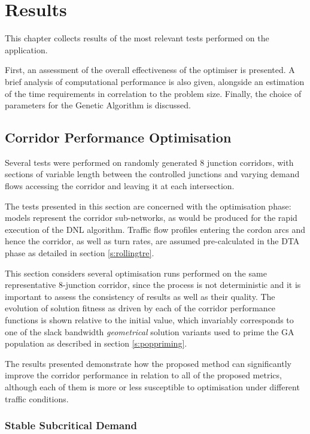 
\chapter{Results} \label{c:results}

This chapter collects results of the most relevant tests performed on the application. 

First, an assessment of the overall effectiveness of the optimiser is presented. A brief analysis of computational performance is also given, alongside an estimation of the time requirements in correlation to the problem size. Finally, the choice of parameters for the Genetic Algorithm is discussed.

\section{Corridor Performance Optimisation} \label{r:kpi}
Several tests were performed on randomly generated 8 junction corridors, with sections of variable length between the controlled junctions and varying demand flows accessing the corridor and leaving it at each intersection.

The tests presented in this section are concerned with the optimisation phase: models represent the corridor sub-networks, as would be produced for the rapid execution of the DNL algorithm. Traffic flow profiles entering the cordon arcs and hence the corridor, as well as turn rates, are assumed pre-calculated in the DTA phase as detailed in section \ref{s:rollingtre}.

This section considers several optimisation runs performed on the same representative 8-junction corridor, since the process is not deterministic and it is important to assess the consistency of results as well as their quality. The evolution of solution fitness as driven by each of the corridor performance functions is shown relative to the initial value, which invariably corresponds to one of the slack bandwidth \emph{geometrical} solution variants used to prime the GA population as described in section \ref{s:poppriming}.

The results presented demonstrate how the proposed method can significantly improve the corridor performance in relation to all of the proposed metrics, although each of them is more or less susceptible to optimisation under different traffic conditions.

\pagebreak
\subsection{Stable Subcritical Demand}


